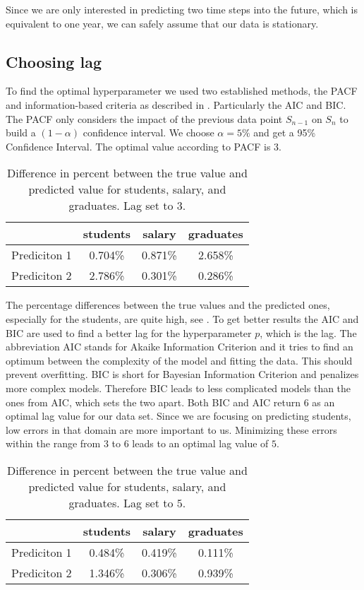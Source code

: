 \documentclass{article}
\theoremstyle{plain}
\theoremstyle{definition}
\theoremstyle{remark}
\begin{document}
Since we are only interested in predicting two time steps into the future, which is equivalent to one year,
we can safely assume that our data is stationary.


\subsection{Choosing lag}\label{sec:methods:lag}
To find the optimal hyperparameter we used two established methods, the PACF and information-based criteria as described in \citep{pacf}. Particularly the AIC and 
BIC. The PACF only considers the impact of the previous data point $S_{n-1}$ on $S_{n}$ to build a $(1-\alpha)$ confidence interval.
We choose $\alpha = 5\%$ and get a 95\% Confidence Interval. The optimal value according to PACF is $3$.
\begin{table}[H]
    \centering
    \begin{tabular}{c|c|c|c}
        & students & salary & graduates \\
        \hline
        Prediciton 1 & 0.704\% & 0.871\% & 2.658\% \\
        \hline
        Prediciton 2 & 2.786\% & 0.301\% & 0.286\%
    \end{tabular}
    \caption{Difference in percent between the true value and predicted value for students, salary, and graduates. Lag set to $3$.}
    \label{tab:resid1}
\end{table}
The percentage differences between the true values and the predicted ones, especially for the students, are quite high, see .
To get better results
the AIC and BIC are used to find a better lag for the hyperparameter $p$, which is the lag. The abbreviation AIC
stands for Akaike Information Criterion and it tries to find an optimum between the complexity of the model and fitting the data.
This should prevent overfitting. 
BIC is short for Bayesian Information Criterion and penalizes more complex models.
Therefore BIC leads to less complicated models than the ones from AIC, which sets the two apart.
Both BIC and AIC return $6$ as an optimal lag value for our data set. Since we are focusing on predicting students, low errors in that domain
are more important to us. Minimizing these errors within the range from $3$ to $6$ leads to an optimal lag value of $5$.
\begin{table}[H]
    \centering
    \begin{tabular}{c|c|c|c}
        & students & salary & graduates \\
        \hline
        Prediciton 1 & 0.484\% & 0.419\% & 0.111\% \\
        \hline
        Prediciton 2 & 1.346\% & 0.306\% & 0.939\%
    \end{tabular}
    \caption{Difference in percent between the true value and predicted value for students, salary, and graduates. Lag set to $5$.}
    \label{tab:resid2}
\end{table}
\end{document}
